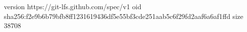 version https://git-lfs.github.com/spec/v1
oid sha256:f2e9b6b79bfb8ff1231619436df5e55bf3cde251aab5c6f29fd2aaf6a6af1ffd
size 38708
